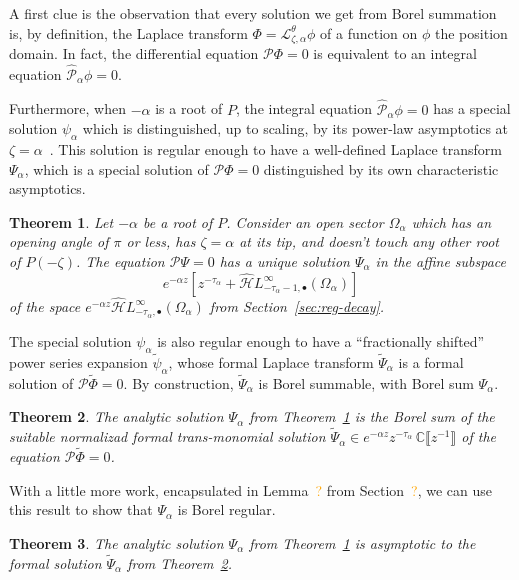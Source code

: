 \documentclass{article}
\newcommand{\dualsingexp}[2]{\widehat{\mathcal{H}}L^\infty_{#1, #2}}
\newcommand{\dualsingexpalg}[1]{\dualsingexp{#1}{\bullet}}
\newcommand{\C}{\mathbb{C}}
\newcommand{\series}[1]{\tilde{#1}}
\newcommand{\laplace}{\mathcal{L}}
\theoremstyle{definition}
\theoremstyle{plain}
\newtheorem{theorem}{Theorem}[section]
\begin{document}
A first clue is the observation that every solution we get from Borel summation is, by definition, the Laplace transform $\Phi = \laplace_{\zeta,\alpha}^\theta \phi$ of a function on $\phi$ the position domain. In fact, the differential equation $\mathcal{P}\Phi = 0$ is equivalent to an integral equation $\hat{\mathcal{P}}_\alpha \phi = 0$.

Furthermore, when $-\alpha$ is a root of $P$, the integral equation $\hat{\mathcal{P}}_\alpha \phi = 0$ has a special solution $\psi_\alpha$ which is distinguished, up to scaling, by its power-law asymptotics at $\zeta = \alpha$~\cite[Theorem~4]{reg-sing-volterra}. This solution is regular enough to have a well-defined Laplace transform $\Psi_\alpha$, which is a special solution of $\mathcal{P}\Phi = 0$ distinguished by its own characteristic asymptotics.
\color{DarkBlue}
\begin{theorem}\label{thm:exist_uniq_ODE}
Let $-\alpha$ be a root of $P$. Consider an open sector $\Omega_\alpha$ which has an opening angle of $\pi$ or less, has $\zeta = \alpha$ at its tip, and doesn't touch any other root of $P(-\zeta)$. The equation $\mathcal{P}\Psi = 0$ has a unique solution $\Psi_\alpha$ in the affine subspace
\[ e^{-\alpha z} \left[ z^{-\tau_\alpha} + \dualsingexpalg{-\tau_\alpha-1}(\Omega_\alpha) \right] \]
of the space $e^{-\alpha z} \dualsingexpalg{-\tau_\alpha}(\Omega_\alpha)$ from Section~\ref{sec:reg-decay}.
\end{theorem}
The special solution $\psi_\alpha$ is also regular enough to have a ``fractionally shifted'' power series expansion $\series{\psi}_\alpha$, whose formal Laplace transform $\series{\Psi}_\alpha$ is a formal solution of $\mathcal{P}\series{\Phi} = 0$. By construction, $\series{\Psi}_\alpha$ is Borel summable, with Borel sum $\Psi_\alpha$.
\begin{theorem}\label{thm:soln_is_Borel_sum}
The analytic solution $\Psi_\alpha$ from Theorem~\ref{thm:exist_uniq_ODE} is the Borel sum of the suitable normalizad formal trans-monomial solution $\series{\Psi}_\alpha \in e^{-\alpha z} z^{-\tau_\alpha}\,\C \llbracket z^{-1} \rrbracket$ of the equation $\mathcal{P}\series{\Phi} = 0$.
\end{theorem}
With a little more work, encapsulated in Lemma~\textcolor{orange}{?} from Section~\textcolor{orange}{?}, we can use this result to show that $\Psi_\alpha$ is Borel regular.
\begin{theorem}\label{thm:soln_is_asymptotic}
The analytic solution $\Psi_\alpha$ from Theorem~\ref{thm:exist_uniq_ODE} is asymptotic to the formal solution $\series{\Psi}_\alpha$ from Theorem~\ref{thm:soln_is_Borel_sum}.
\end{theorem}
\end{document}
